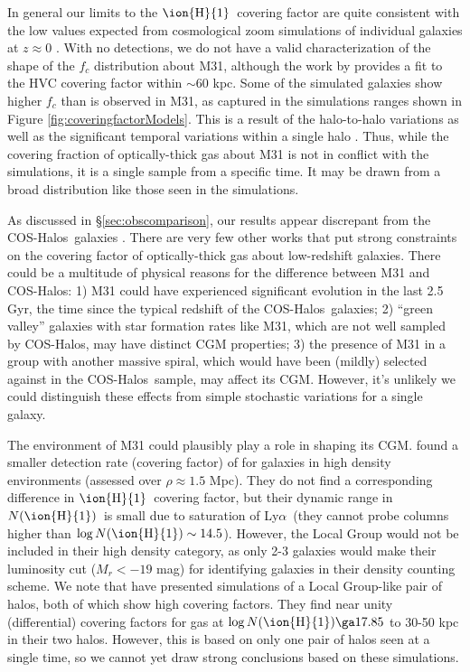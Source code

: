 \documentclass[12pt,preprint]{aastex6}
\newcommand{\HI}{\ensuremath{\mbox{\ion{H}{1}}}}
\newcommand{\lya}{Ly$\alpha$\relax}
\newcommand{\NHI}{\ensuremath{N(\mbox{\ion{H}{1}})}\relax}
\newcommand{\logNHI}{\ensuremath{\log N(\mbox{\ion{H}{1}})}\relax}
\newcommand{\coshalos}{COS-Halos}
\begin{document}
In general our limits to the \HI\ covering factor are quite consistent
with the low values expected from cosmological zoom simulations of
individual galaxies at $z \approx 0$
\citep[][]{gutcke2016}. With no detections, we
do not have a valid characterization of the shape of the $f_c$
distribution about M31, although the work by \cite{richter2012}
provides a fit to the HVC covering factor within $\sim60$ kpc. Some of
the simulated galaxies show higher $f_c$ than is observed in M31, as
captured in the simulations ranges shown in Figure
\ref{fig:coveringfactorModels}. This is a result of the halo-to-halo
variations as well as the significant temporal variations within a
single halo \citep[][]{rahmati2015,
  cafg2015}. Thus, while the covering fraction of optically-thick gas
about M31 is not in conflict with the simulations, it is a single
sample from a specific time. It may be drawn from a broad distribution
like those seen in the simulations.


As discussed in \S \ref{sec:obscomparison}, our results appear
discrepant from the \coshalos\ galaxies \citep{tumlinson2013,
  prochaska2017}. There are very few other works that put strong
constraints on the covering factor of optically-thick gas about
low-redshift galaxies. There could be a multitude of physical reasons
for the difference between M31 and \coshalos : 1) M31 could have
experienced significant evolution in the last 2.5 Gyr, the time since
the typical redshift of the \coshalos\ galaxies; 2) ``green valley''
galaxies with star formation rates like M31, which are not well
sampled by \coshalos, may have distinct CGM properties; 3) the
presence of M31 in a group with another massive spiral, which would
have been (mildly) selected against in the \coshalos\ sample, may
affect its CGM. However, it's unlikely we could distinguish these
effects from simple stochastic variations for a single galaxy.

The environment of M31 could plausibly play a role in shaping its
CGM. \cite{burchett2016} found a smaller detection rate (covering
factor) of  for galaxies in high density environments
(assessed over $\rho \approx 1.5$ Mpc). They do not find a
corresponding difference in \HI\ covering factor, but their dynamic
range in \NHI\ is small due to saturation of \lya\ (they cannot probe
columns higher than $\logNHI \sim 14.5$). However, the Local Group
would not be included in their high density category, as only 2-3
galaxies would make their luminosity cut ($M_r < -19$ mag) for
identifying galaxies in their density counting scheme. We note that
\citet{nuza2014} have presented simulations of a Local Group-like pair
of halos, both of which show high covering factors. They find near
unity (differential) covering factors for gas at $\logNHI \ga 17.85$
to 30-50 kpc in their two halos. However, this is based on only one
pair of halos seen at a single time, so we cannot yet draw strong
conclusions based on these simulations.
\end{document}
